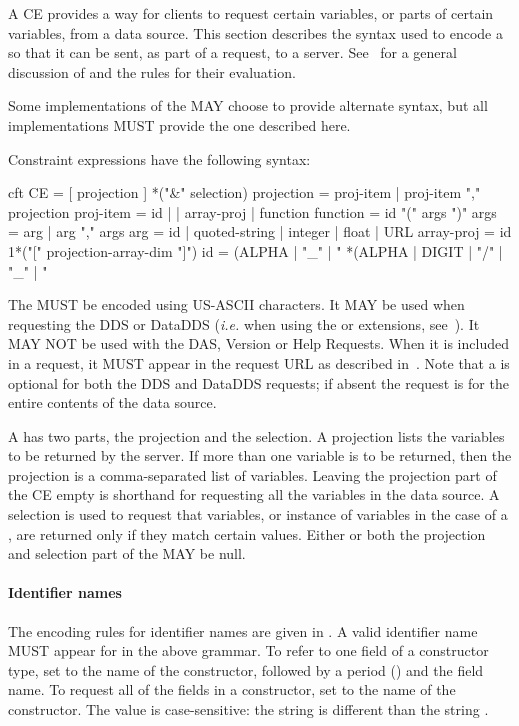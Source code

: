 \documentclass[justify]{nasa-ese}
\begin{document}
A \ac{CE} provides a way for clients to request certain variables, or
parts of certain variables, from a data source. This section describes
the syntax used to encode a \CE so that it can be sent, as part of a
request, to a server. See~ for a general discussion
of \CEs and the rules for their evaluation.

Some implementations of the \DAP MAY choose to provide alternate \CE
syntax, but all implementations MUST provide the one described here.

Constraint expressions have the following syntax:

\begin{vcode}{cft}
CE         = [ projection ] *("&" selection) 
projection = proj-item | proj-item "," projection 
proj-item  = id | | array-proj | function 
function   = id "(" args ")" 
args       = arg | arg "," args 
arg        = id | quoted-string | integer | float | URL 
array-proj = id 1*("[" projection-array-dim "]")
id         = (ALPHA | "_" | "%
              *(ALPHA | DIGIT | "/" | "_" | "%
\end{vcode}
\label{grammar-fix-08.28.07}

The \CE MUST be encoded using US-ASCII characters. It MAY be used when
requesting the DDS or DataDDS ({\it i.e.} when using the  or
 extensions, see~). It MAY NOT be used with
the DAS, Version or Help Requests. When it is included in a request, it MUST
appear in the request URL as described in~. Note
that a \CE is optional for both the DDS and DataDDS requests; if absent the
request is for the entire contents of the data source.

A \CE has two parts, the projection and the selection. A projection lists
the variables to be returned by the \DAP server. If more than one
variable is to be returned, then the projection is a comma-separated list of
variables. Leaving the projection part of the \ac{CE} empty is shorthand for
requesting all the variables in the data source. A selection is used to
request that variables, or instance of variables in the case of a \Sequence,
are returned only if they match certain values. Either or both the projection
and selection part of the \CE MAY be null.

\paragraph{Identifier names}
The encoding rules for identifier names are given in . A 
valid identifier name MUST appear for  in the above grammar. To
refer to one field of a constructor type, set  to the name of the
constructor, followed by a period () and the field name. To request
all of the fields in a constructor, set  to the name of the
constructor. The  value is case-sensitive: the string  is
different than the string .
\end{document}
